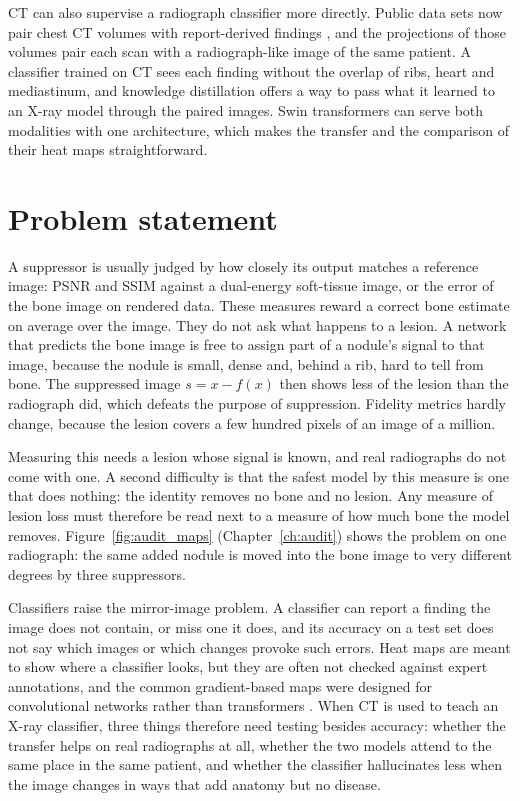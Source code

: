 CT can also supervise a radiograph classifier more directly. Public data sets now pair chest CT volumes with report-derived findings
\citep{hamamci2026ctrate}, and the projections of those volumes \citep{angaitkar2026anatomy} pair each scan with a radiograph-like image of
the same patient. A classifier trained on CT sees each finding without the overlap of ribs, heart and mediastinum, and knowledge
distillation \citep{hinton2015distilling} offers a way to pass what it learned to an X-ray model through the paired images. Swin
transformers \citep{liu2022swinv2} can serve both modalities with one architecture, which makes the transfer and the comparison of their
heat maps straightforward.

\section{Problem statement}
A suppressor is usually judged by how closely its output matches a reference image: PSNR and SSIM against a dual-energy soft-tissue image, or
the error of the bone image on rendered data. These measures reward a correct bone estimate on average over the image. They do not ask what
happens to a lesion. A network that predicts the bone image is free to assign part of a nodule's signal to that image, because the nodule is
small, dense and, behind a rib, hard to tell from bone. The suppressed image $s=x-f(x)$ then shows less of the lesion than the radiograph did,
which defeats the purpose of suppression. Fidelity metrics hardly change, because the lesion covers a few hundred pixels of an image of a
million.

Measuring this needs a lesion whose signal is known, and real radiographs do not come with one. A second difficulty is that the safest model
by this measure is one that does nothing: the identity removes no bone and no lesion. Any measure of lesion loss must therefore be read next to
a measure of how much bone the model removes. Figure~\ref{fig:audit_maps} (Chapter~\ref{ch:audit}) shows the problem on one radiograph: the
same added nodule is moved into the bone image to very different degrees by three suppressors.

Classifiers raise the mirror-image problem. A classifier can report a finding the image does not contain, or miss one it does, and its
accuracy on a test set does not say which images or which changes provoke such errors. Heat maps are meant to show where a classifier looks,
but they are often not checked against expert annotations, and the common gradient-based maps were designed for convolutional networks
rather than transformers \citep{chattopadhay2018gradcampp}. When CT is used to teach an X-ray classifier, three things therefore need testing besides accuracy: whether the transfer helps
on real radiographs at all, whether the two models attend to the same place in the same patient, and whether the classifier hallucinates
less when the image changes in ways that add anatomy but no disease.

